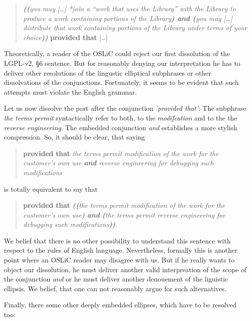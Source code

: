 \begin{quote}\noindent\emph{\textbf{((}you may [\ldots] \emph{*join} a
\enquote{work that uses the Library} with the Library to produce a work
containing portions of the Library\textbf{) and (}you may [\ldots] distribute
that work containing portions of the Library under terms of your
choice\textbf{))}} \textbf{provided that} [\ldots]\end{quote}

Theoretically, a reader of the OSLiC could reject our first dissolution of the
LGPL-v2, §6 sentence. But for reasonably denying our interpretation he has to
deliver other resolutions of the lingustic elliptical subphrases or other
dissolvations of the conjunctions. Fortunately, it seems to be evident that such
attempts must violate the English grammar.

Let us now dissolve the part after the conjunction \emph{'provided that'}: The
subphrase \emph{the terms permit} syntactically refer to both, to the
\emph{modifcation} and to the the \emph{reverse engineering}. The embedded
conjunction \emph{and} establishes a more stylish compression. So, it should be
clear, that saying

\begin{quote}\noindent\textbf{provided that} \emph{the terms permit modification
of the work for the customer's own use \emph{\textbf{and}} reverse engineering
for debugging such modifications}\end{quote}

is totally equivalent to say that 

\begin{quote}\noindent[\ldots] \textbf{provided that} \emph{\textbf{((}the terms
permit modification of the work for the customer's own use\textbf{)}
\emph{\textbf{and}} \textbf{(}the terms permit reverse engineering for debugging
such modifications\textbf{))}}.
\end{quote}

We belief that there is no other possibility to understand this sentence with
respect to the rules of English language. Nevertheless, formally this is another
point where an OSLiC reader may disagree with us. But if he really wants to
object our dissolution, he must deliver another valid interpreation of the scope
of the conjunction \emph{and} or he must deliver another denouement of the
liguistic ellipsis. We belief, that one can not reasonably argue for such
alternatives.

Finally, there some other deeply embedded ellipses, which have to be
resolved too:


